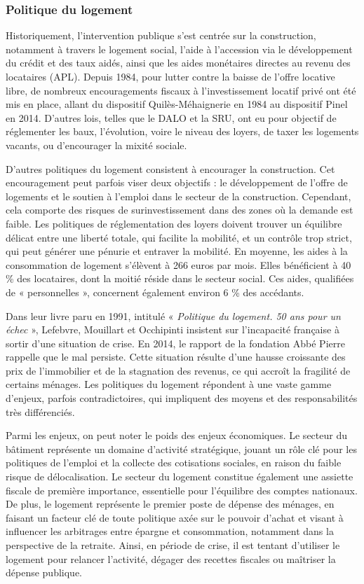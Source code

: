 \documentclass[a4paper, 12pt]{report}
\begin{document}
\subsubsection{Politique du logement}

Historiquement, l’intervention publique s’est centrée sur la construction, notamment à travers le logement social, l’aide à l’accession via le développement du crédit et des taux aidés, ainsi que les aides monétaires directes au revenu des locataires (APL). Depuis 1984, pour lutter contre la baisse de l’offre locative libre, de nombreux encouragements fiscaux à l’investissement locatif privé ont été mis en place, allant du dispositif Quilès-Méhaignerie en 1984 au dispositif Pinel en 2014. D’autres lois, telles que le DALO et la SRU, ont eu pour objectif de réglementer les baux, l’évolution, voire le niveau des loyers, de taxer les logements vacants, ou d’encourager la mixité sociale.

D’autres politiques du logement consistent à encourager la construction. Cet encouragement peut parfois viser deux objectifs : le développement de l’offre de logements et le soutien à l’emploi dans le secteur de la construction. Cependant, cela comporte des risques de surinvestissement dans des zones où la demande est faible. Les politiques de réglementation des loyers doivent trouver un équilibre délicat entre une liberté totale, qui facilite la mobilité, et un contrôle trop strict, qui peut générer une pénurie et entraver la mobilité. En moyenne, les aides à la consommation de logement s’élèvent à 266 euros par mois. Elles bénéficient à 40 \% des locataires, dont la moitié réside dans le secteur social. Ces aides, qualifiées de « personnelles », concernent également environ 6 \% des accédants.

Dans leur livre paru en 1991, intitulé « \textit{Politique du logement. 50 ans pour un échec }», Lefebvre, Mouillart et Occhipinti insistent sur l’incapacité française à sortir d’une situation de crise. En 2014, le rapport de la fondation Abbé Pierre rappelle que le mal persiste. Cette situation résulte d’une hausse croissante des prix de l’immobilier et de la stagnation des revenus, ce qui accroît la fragilité de certains ménages. Les politiques du logement répondent à une vaste gamme d’enjeux, parfois contradictoires, qui impliquent des moyens et des responsabilités très différenciés.

Parmi les enjeux, on peut noter le poids des enjeux économiques. Le secteur du bâtiment représente un domaine d’activité stratégique, jouant un rôle clé pour les politiques de l’emploi et la collecte des cotisations sociales, en raison du faible risque de délocalisation. Le secteur du logement constitue également une assiette fiscale de première importance, essentielle pour l’équilibre des comptes nationaux. De plus, le logement représente le premier poste de dépense des ménages, en faisant un facteur clé de toute politique axée sur le pouvoir d’achat et visant à influencer les arbitrages entre épargne et consommation, notamment dans la perspective de la retraite. Ainsi, en période de crise, il est tentant d'utiliser le logement pour relancer l’activité, dégager des recettes fiscales ou maîtriser la dépense publique.
\end{document}
